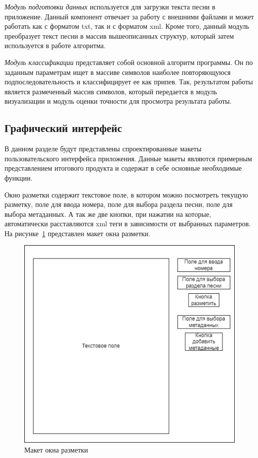 \textit{Модуль подготовки данных} используется для загрузки текста песни в приложение. Данный компонент отвечает за работу с внешними файлами и может работать как с форматом txt, так и с форматом xml. Кроме того, данный модуль преобразует текст песни в массив вышеописанных структур, который затем используется в работе алгоритма.

\textit{Модуль классификации} представляет собой основной алгоритм программы. Он по заданным параметрам ищет в массиве символов наиболее повторяющуюся подпоследовательность и классифицирует ее как припев. Так, результатом работы является размеченный массив символов, который передается в модуль визуализации и модуль оценки точности для просмотра результата работы.

\vspace{2em}
\subsection{Графический интерфейс}
В данном разделе будут представлены спроектированные макеты
пользовательского интерфейса приложения. Данные макеты являются примерным представлением итогового продукта и содержат в себе основные
необходимые функции.

Окно разметки содержит текстовое поле, в котором можно посмотреть текущую разметку, поле для ввода номера, поле для выбора раздела песни, поле для выбора метаданных. А так же две кнопки, при нажатии на которые, автоматически расставляются xml теги в зависимости от выбранных параметров. На рисунке~\ref{fig:Разметка} представлен макет окна разметки.

\begin{figure}
    \centering
    \includegraphics[width=1\linewidth]{pictures/Разметка.png}
    \caption{Макет окна разметки}
    \label{fig:Разметка}
\end{figure}

